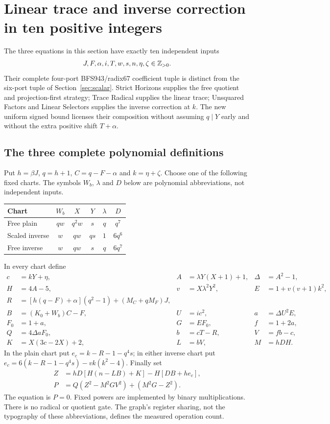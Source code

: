 \section{Linear trace and inverse correction in ten positive integers}
\label{sec:positive}
The three equations in this section have exactly ten independent inputs
\[
 J,F,\alpha,i,T,w,s,n,\eta,\zeta\in\mathbb Z_{>0}.
\]
Their complete four-port BFS943/radix67 coefficient tuple is distinct
from the six-port tuple of Section~\ref{sec:scalar}. Strict Horizons
supplies the free quotient and projection-first strategy; Trace Radical
supplies the linear trace; Unsquared Factors and Linear Selectors
supplies the inverse correction at $k$. The new uniform signed bound
licenses their composition without assuming $q\mid Y$ early and
without the extra positive shift $T+\alpha$.

\subsection{The three complete polynomial definitions}
Put $h=\beta J$, $q=h+1$, $C=q-F-\alpha$ and $k=\eta+\zeta$.
Choose one of the following fixed charts. The symbols $W_b$, $\lambda$
and $D$ below are polynomial abbreviations, not independent inputs.
\begin{center}\small
\begin{tabular}{@{}lccccc@{}}\toprule
Chart & $W_b$ & $X$ & $Y$ & $\lambda$ & $D$\\\midrule
Free plain & $qw$ & $q^2w$ & $s$ & $q$ & $q^7$\\
Scaled inverse & $w$ & $qw$ & $qs$ & $1$ & $6q^6$\\
Free inverse & $w$ & $qw$ & $s$ & $q$ & $6q^7$\\\bottomrule
\end{tabular}
\end{center}
In every chart define
\begin{align*}
 c&=kY+\eta,& A&=\lambda Y(X+1)+1,&\Delta&=A^2-1,\\
 H&=4A-5,&v&=X\lambda^2Y^2,&E&=1+v(v+1)k^2,\\
 R&=[h(q-F)+\alpha](q^2-1)+(M_C+qM_F)J,\\
 B&=(K_0+W_b)C-F,&U&=ic^2,&a&=\Delta U^2E,\\
 F_0&=1+a,&G&=EF_0,&f&=1+2a,\\
 Q&=4\Delta aF_0,&b&=cT-R,&V&=fb-c,\\
 K&=X(3c-2X)+2,&L&=bV,&M&=hDH.
\end{align*}
In the plain chart put $e_c=k-R-1-q^4s$; in either inverse chart put
$e_c=6(k-R-1-q^4s)-vk(k^2-4)$. Finally set
\begin{align}
 Z&=hD[H(n-LB)+K]-H[DB+he_c],\nonumber\\
 P&=Q(Z^2-M^2GV^2)+(M^2G-Z^2).\label{eq:positive-polynomial}
\end{align}
The equation is $P=0$. Fixed powers are implemented by binary
multiplications. There is no radical or quotient gate. The graph's
register sharing, not the typography of these abbreviations, defines
the measured operation count.

